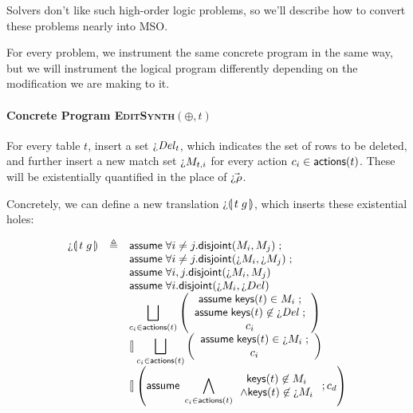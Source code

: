 Solvers don't like such high-order logic problems, so we'll describe how to
convert these problems nearly into MSO.

For every problem, we instrument the same concrete program in the same way, but
we will instrument the logical program differently depending on the modification
we are making to it.

\paragraph{Concrete Program \textsc{EditSynth}$(\oplus, t)$}

For every table $t$, insert a set $\hole{\mathit{Del}_t}$, which indicates the
set of rows to be deleted, and further insert a new match set $\hole{M_{t,i}}$
for every action $c_i \in \mathsf{actions}(t)$. These will be existentially quantified in
the place of $\vec{\hole{\rho}}$.

Concretely, we can define a new translation $\hole{}\parenbb{t\; g}$,
which inserts these existential holes:

\[\begin{array}{lcl}
    \hole\parenbb{t\; g}
    & \triangleq
    & \assume{\forall i\neq j. \textsf{disjoint}(M_i,M_j)}; \\
    && \assume{\forall i\neq j. \textsf{disjoint}(\hole M_i,\hole M_j)};\\
    && \assume{\forall i,j. \textsf{disjoint}(\hole M_i, M_j)} \\
    && \assume{\forall i. \textsf{disjoint}(\hole M_i, \hole{Del})} \\
    && \displaystyle \Angel_{c_i \in \actions t}
       \left(\begin{array}{c}
         \assume{\keys t \in M_i}; \\
         \assume{\keys t \not\in \hole{\mathit{Del}}};\\
         c_i \\
       \end{array}\right)\\
    && \angel \displaystyle \Angel_{c_i \in \actions t}
       \left(\begin{array}{c}
               \assume{\keys t \in \hole{M_i}}; \\
               c_i \\
             \end{array}\right)\\
    && \displaystyle \angel \left(\assume{\bigwedge_{c_i \in \actions t}
       \begin{array}{c}
         \keys t \not\in M_i\\
         \wedge \keys t \not\in \hole M_i
       \end{array}}; c_d\right)
\end{array}\]


